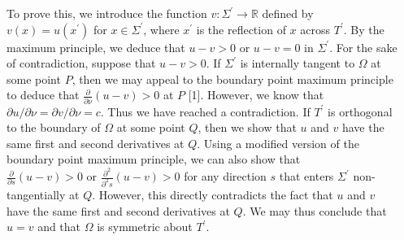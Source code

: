 \documentclass[20pt,,margin=1in,innermargin=-4.5in,blockverticalspace=-0.25in]{tikzposter}
\begin{document}
\begin{columns}
{\begin{center}
\end{center}
    To prove this, we introduce the function $v: \Sigma^\prime \rightarrow \mathbb{R}$ defined by $v(x) = u(x^\prime)$ for $x \in \Sigma^\prime$, where $x^\prime$ is the reflection of $x$ across $T^\prime$. By the maximum principle, we deduce that $u - v > 0$ or $u-v = 0$ in $\Sigma^\prime$. For the sake of contradiction, suppose that $u-v > 0$.  If $\Sigma^\prime$ is internally tangent to $\Omega$ at some point $P$, then we may appeal to the boundary point maximum principle to deduce that $\frac{\partial}{\partial{\nu}}(u-v) > 0$ at $P$ [1]. However, we know that $\partial{u}/\partial{\nu} = \partial{v}/\partial{\nu} = c$. Thus we have reached a contradiction. If $T^\prime$ is orthogonal to the boundary of $\Omega$ at some point $Q$, then we show that $u$ and $v$ have the same first and second derivatives at $Q$. Using a modified version of the boundary point maximum principle, we can also show that $\frac{\partial}{\partial{s}} (u-v) > 0 \text{ or } \frac{\partial^2}{\partial^2{s}}(u-v) > 0$ for any direction $s$ that enters $\Sigma^\prime$ non-tangentially at $Q$. However, this directly contradicts the fact that $u$ and $v$ have the same first and second derivatives at $Q$. We may thus conclude that $u=v$ and that $\Omega$ is symmetric about $T^\prime$.
}



\end{columns}
\end{document}
